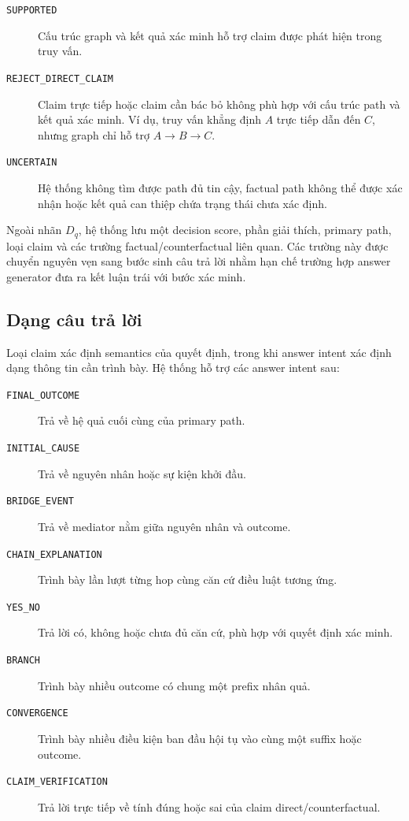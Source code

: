 \begin{description}
    \item[\texttt{SUPPORTED}] Cấu trúc graph và kết quả xác minh hỗ trợ claim
    được phát hiện trong truy vấn.

    \item[\texttt{REJECT\_DIRECT\_CLAIM}] Claim trực tiếp hoặc claim cần bác
    bỏ không phù hợp với cấu trúc path và kết quả xác minh. Ví dụ, truy vấn
    khẳng định \(A\) trực tiếp dẫn đến \(C\), nhưng graph chỉ hỗ trợ
    \(A \rightarrow B \rightarrow C\).

    \item[\texttt{UNCERTAIN}] Hệ thống không tìm được path đủ tin cậy, factual
    path không thể được xác nhận hoặc kết quả can thiệp chứa trạng thái chưa
    xác định.
\end{description}

Ngoài nhãn \(D_q\), hệ thống lưu một decision score, phần giải thích, primary
path, loại claim và các trường factual/counterfactual liên quan. Các trường
này được chuyển nguyên vẹn sang bước sinh câu trả lời nhằm hạn chế trường
hợp answer generator đưa ra kết luận trái với bước xác minh.

\subsection{Dạng câu trả lời}

Loại claim xác định semantics của quyết định, trong khi answer intent xác
định dạng thông tin cần trình bày. Hệ thống hỗ trợ các answer intent sau:

\begin{description}
    \item[\texttt{FINAL\_OUTCOME}] Trả về hệ quả cuối cùng của primary path.

    \item[\texttt{INITIAL\_CAUSE}] Trả về nguyên nhân hoặc sự kiện khởi đầu.

    \item[\texttt{BRIDGE\_EVENT}] Trả về mediator nằm giữa nguyên nhân và
    outcome.

    \item[\texttt{CHAIN\_EXPLANATION}] Trình bày lần lượt từng hop cùng căn
    cứ điều luật tương ứng.

    \item[\texttt{YES\_NO}] Trả lời có, không hoặc chưa đủ căn cứ, phù hợp
    với quyết định xác minh.

    \item[\texttt{BRANCH}] Trình bày nhiều outcome có chung một prefix nhân
    quả.

    \item[\texttt{CONVERGENCE}] Trình bày nhiều điều kiện ban đầu hội tụ vào
    cùng một suffix hoặc outcome.

    \item[\texttt{CLAIM\_VERIFICATION}] Trả lời trực tiếp về tính đúng hoặc
    sai của claim direct/counterfactual.
\end{description}

